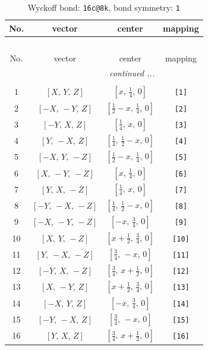 \documentclass[fleqn,8pt]{jsarticle}
\begin{document}
\begin{longtable}{cccc}
\caption{Wyckoff bond: {\tt 16c@8k}, bond symmetry: {\tt 1}}
 \\
 \hline \hline
No. & vector & center & mapping \\ \hline \endfirsthead

\multicolumn{3}{l}{\tablename\ \thetable{}} \\
 \hline \hline
No. & vector & center & mapping \\ \hline \endhead

 \hline \hline
\multicolumn{3}{r}{\footnotesize\it continued ...} \\ \endfoot

 \hline \hline
\multicolumn{3}{r}{} \\ \endlastfoot

1 & $\left[ X,\, Y,\, Z \right]$ & $\left[ x,\, \frac{1}{4},\, 0 \right]$ & {\tt [1]} \\ \hline
2 & $\left[ - X,\, - Y,\, Z \right]$ & $\left[ \frac{1}{2} - x,\, \frac{1}{4},\, 0 \right]$ & {\tt [2]} \\ \hline
3 & $\left[ - Y,\, X,\, Z \right]$ & $\left[ \frac{1}{4},\, x,\, 0 \right]$ & {\tt [3]} \\ \hline
4 & $\left[ Y,\, - X,\, Z \right]$ & $\left[ \frac{1}{4},\, \frac{1}{2} - x,\, 0 \right]$ & {\tt [4]} \\ \hline
5 & $\left[ - X,\, Y,\, - Z \right]$ & $\left[ \frac{1}{2} - x,\, \frac{1}{4},\, 0 \right]$ & {\tt [5]} \\ \hline
6 & $\left[ X,\, - Y,\, - Z \right]$ & $\left[ x,\, \frac{1}{4},\, 0 \right]$ & {\tt [6]} \\ \hline
7 & $\left[ Y,\, X,\, - Z \right]$ & $\left[ \frac{1}{4},\, x,\, 0 \right]$ & {\tt [7]} \\ \hline
8 & $\left[ - Y,\, - X,\, - Z \right]$ & $\left[ \frac{1}{4},\, \frac{1}{2} - x,\, 0 \right]$ & {\tt [8]} \\ \hline
9 & $\left[ - X,\, - Y,\, - Z \right]$ & $\left[ - x,\, \frac{3}{4},\, 0 \right]$ & {\tt [9]} \\ \hline
10 & $\left[ X,\, Y,\, - Z \right]$ & $\left[ x + \frac{1}{2},\, \frac{3}{4},\, 0 \right]$ & {\tt [10]} \\ \hline
11 & $\left[ Y,\, - X,\, - Z \right]$ & $\left[ \frac{3}{4},\, - x,\, 0 \right]$ & {\tt [11]} \\ \hline
12 & $\left[ - Y,\, X,\, - Z \right]$ & $\left[ \frac{3}{4},\, x + \frac{1}{2},\, 0 \right]$ & {\tt [12]} \\ \hline
13 & $\left[ X,\, - Y,\, Z \right]$ & $\left[ x + \frac{1}{2},\, \frac{3}{4},\, 0 \right]$ & {\tt [13]} \\ \hline
14 & $\left[ - X,\, Y,\, Z \right]$ & $\left[ - x,\, \frac{3}{4},\, 0 \right]$ & {\tt [14]} \\ \hline
15 & $\left[ - Y,\, - X,\, Z \right]$ & $\left[ \frac{3}{4},\, - x,\, 0 \right]$ & {\tt [15]} \\ \hline
16 & $\left[ Y,\, X,\, Z \right]$ & $\left[ \frac{3}{4},\, x + \frac{1}{2},\, 0 \right]$ & {\tt [16]} \\
\end{longtable}
\end{document}
